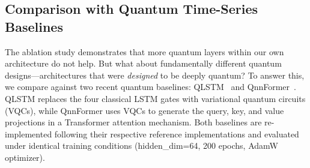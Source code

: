 \documentclass[conference]{IEEEtran}
\begin{document}
\subsection{Comparison with Quantum Time-Series Baselines}

The ablation study demonstrates that more quantum layers within our own architecture do not help. But what about fundamentally different quantum designs---architectures that were \emph{designed} to be deeply quantum? To answer this, we compare against two recent quantum baselines: QLSTM~\cite{chen2022quantum} and QnnFormer~\cite{cai2024qnnformer}. QLSTM replaces the four classical LSTM gates with variational quantum circuits (VQCs), while QnnFormer uses VQCs to generate the query, key, and value projections in a Transformer attention mechanism. Both baselines are re-implemented following their respective reference implementations and evaluated under identical training conditions (hidden\_dim=64, 200 epochs, AdamW optimizer).
\end{document}
